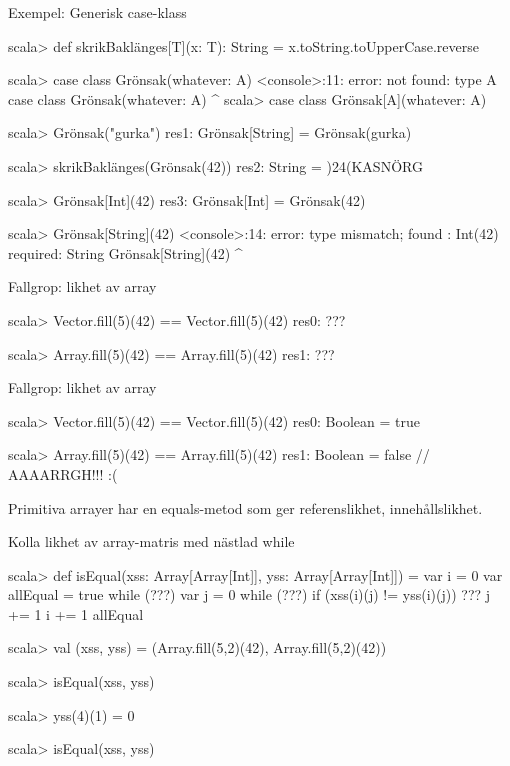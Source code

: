 \begin{Slide}{Exempel: Generisk case-klass}
\vspace{-0.5em}\begin{REPL}
scala> def skrikBaklänges[T](x: T): String = x.toString.toUpperCase.reverse

scala> case class Grönsak(whatever: A)
<console>:11: error: not found: type A
       case class Grönsak(whatever: A)
                                    ^
scala> case class Grönsak[A](whatever: A)

scala> Grönsak("gurka")
res1: Grönsak[String] = Grönsak(gurka)

scala> skrikBaklänges(Grönsak(42))
res2: String = )24(KASNÖRG

scala> Grönsak[Int](42)
res3: Grönsak[Int] = Grönsak(42)

scala> Grönsak[String](42)
<console>:14: error: type mismatch;
 found   : Int(42)
 required: String
       Grönsak[String](42)
                       ^
\end{REPL}
\end{Slide}

\begin{Slide}{Fallgrop: likhet av array}
\begin{REPL}
scala> Vector.fill(5)(42) == Vector.fill(5)(42)
res0: ???

scala> Array.fill(5)(42) == Array.fill(5)(42)
res1: ???
\end{REPL}
\end{Slide}


\begin{Slide}{Fallgrop: likhet av array}
\begin{REPL}
scala> Vector.fill(5)(42) == Vector.fill(5)(42)
res0: Boolean = true

scala> Array.fill(5)(42) == Array.fill(5)(42)
res1: Boolean = false  // AAAARRGH!!! :(
\end{REPL}
Primitiva arrayer har en equals-metod som ger referenslikhet,  innehållslikhet.
\end{Slide}

\begin{Slide}{Kolla likhet av array-matris med nästlad while}
\begin{REPL}
scala> def isEqual(xss: Array[Array[Int]], yss: Array[Array[Int]]) = {
         var i = 0
         var allEqual = true
         while (???) {
           var j = 0
           while (???) {
             if (xss(i)(j) != yss(i)(j)) ???
             j += 1
           }
           i += 1
         }
         allEqual
       }

scala> val (xss, yss) = (Array.fill(5,2)(42), Array.fill(5,2)(42))

scala> isEqual(xss, yss)

scala> yss(4)(1) = 0

scala> isEqual(xss, yss)
\end{REPL}
\end{Slide}



